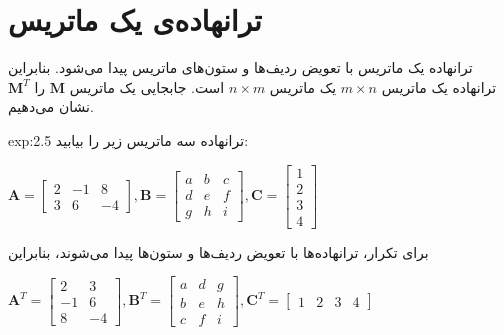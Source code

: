 \section{\textbf{ترانهاده‌ی یک ماتریس}}
\label{sec:2.3}
{
    \Large
    \begin{spacing}{1.5}
        ترانهاده یک ماتریس با تعویض ردیف‌ها و ستون‌های ماتریس پیدا می‌شود.
        بنابراین ترانهاده یک ماتریس $m\times n$ یک ماتریس $n\times m$ است.
        جابجایی یک ماتریس $\textbf{M}$ را $\textbf{M}^T$ نشان می‌دهیم.

        \begin{example}{exp:2.5}
            \Large
            ترانهاده سه ماتریس زیر را بیابید:\\

            \begin{center}
                $\textbf{A}=\begin{bmatrix}
                                2 & -1 & 8  \\
                                3 & 6  & -4
                \end{bmatrix}, \textbf{B}=\begin{bmatrix}
                                              a & b & c \\
                                              d & e & f \\
                                              g & h & i
                \end{bmatrix}, \textbf{C}=\begin{bmatrix}
                                              1 \\
                                              2 \\
                                              3 \\
                                              4
                \end{bmatrix}$
            \end{center}

            برای تکرار، ترانهاده‌ها با تعویض ردیف‌ها و ستون‌ها پیدا می‌شوند، بنابراین

            \begin{center}
                $\textbf{A}^T=\begin{bmatrix}
                                  2  & 3  \\
                                  -1 & 6  \\
                                  8  & -4
                \end{bmatrix}, \textbf{B}^T=\begin{bmatrix}
                                                a & d & g \\
                                                b & e & h \\
                                                c & f & i
                \end{bmatrix}, \textbf{C}^T=\begin{bmatrix}
                                                1 & 2 & 3 & 4
                \end{bmatrix}$
            \end{center}


\end{example}
\end{spacing}}
